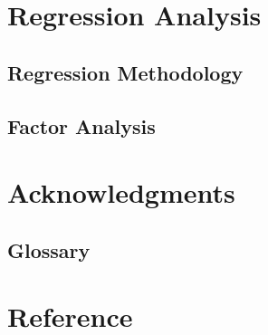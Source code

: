 \documentclass[11pt]{article}
\numberwithin{equation}{section}
\numberwithin{table}{section}
\numberwithin{figure}{section}
\begin{document}
\section{Regression Analysis} \label{sec:regression}

\subsection{Regression Methodology}

\subsection{Factor Analysis}






\newpage
\section{Acknowledgments} \label{sec:thanks}






\begin{appendices}

\newpage
\section{Glossary} \label{sec:}


\end{appendices}




\newpage
\section*{Reference} \label{sec:ref}
\end{document}
